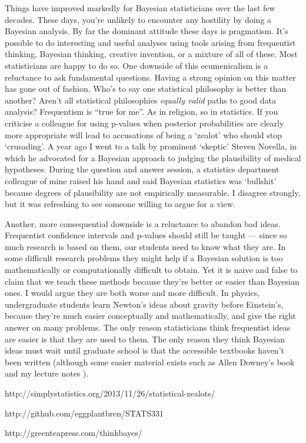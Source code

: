 \documentclass[a4paper, 12pt]{article}
\begin{document}
Things have improved markedly for Bayesian statisticians over the last few
decades. These days, you're unlikely to encounter any hostility by doing
a Bayesian analysis. By far the dominant attitude these days
is pragmatism. It's possible to do interesting and useful analyses using tools
arising from frequentist thinking, Bayesian thinking, creative invention, or
a mixture of all of these. Most statisticians are happy to do so.
One downside of this ecumenicalism is a reluctance to ask fundamental
questions. Having a strong opinion on this matter has gone out of fashion.
Who's to say one statistical philosophy is better than
another? Aren't all statistical philosophies {\it equally valid} paths to good
data analysis? Frequentism is ``true for me''. As in religion, so in statistics.
If you criticise a colleague for using p-values when posterior probabilities
are clearly more appropriate will lead to accusations of being a `zealot'
\citep{simply_statistics} who should stop `crusading'.
A year ago I went to a talk by prominent `skeptic' Steven Novella, in which
he advocated for a Bayesian approach to judging the plausibility of medical
hypotheses. During the question and answer session, a statistics department colleague of mine raised his hand and said Bayesian statistics was `bullshit' because degrees of plausibility are not empirically measurable. I disagree
strongly, but it was refreshing to see someone willing to argue for a view.

Another, more consequential downside is a reluctance to abandon bad ideas.
Frequentist confidence intervals and p-values should still be taught
--- since so much research is based on them, our students need to know what
they are. In some difficult research problems they might help if a Bayesian solution is too mathematically or computationally difficult to obtain.
Yet it is naive and false to claim that we teach these methods because they're
better or easier than Bayesian ones. I would argue they are both worse and
more difficult. In physics, undergraduate students learn Newton's ideas about
gravity before Einstein's, because they're much easier conceptually and
mathematically, and give the right answer on many problems. The only reason
statisticians think frequentist ideas are easier is that they are used to them.
The only reason they think Bayesian ideas must wait until graduate school is
that the accessible textbooks haven't been written (although some easier material
exists such as Allen Downey's book \citep{downey} and my lecture
notes \citep{331}).

\begin{thebibliography}{999} %
http://simplystatistics.org/2013/11/26/statistical-zealots/

http://github.com/eggplantbren/STATS331

http://greenteapress.com/thinkbayes/

\end{thebibliography}
\end{document}
